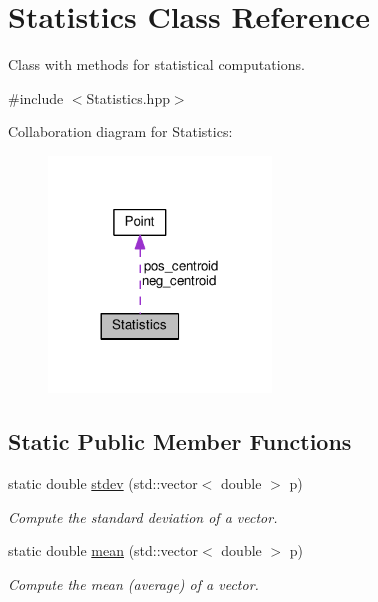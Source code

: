 \hypertarget{class_statistics}{}\section{Statistics Class Reference}
\label{class_statistics}


Class with methods for statistical computations.  




{\ttfamily \#include $<$Statistics.\+hpp$>$}



Collaboration diagram for Statistics\+:\nopagebreak
\begin{figure}[H]
\begin{center}
\leavevmode
\includegraphics[width=168pt]{class_statistics__coll__graph}
\end{center}
\end{figure}
\subsection*{Static Public Member Functions}
\begin{DoxyCompactItemize}
\item 
static double \hyperlink{class_statistics_a4c1ba6a34efe8686419edd83e7c6d579}{stdev} (std\+::vector$<$ double $>$ p)
\begin{DoxyCompactList}\small\item\em Compute the standard deviation of a vector. \end{DoxyCompactList}\item 
static double \hyperlink{class_statistics_ad56432dac5366707268de10e58f7972a}{mean} (std\+::vector$<$ double $>$ p)
\begin{DoxyCompactList}\small\item\em Compute the mean (average) of a vector. \end{DoxyCompactList}\end{DoxyCompactItemize}
